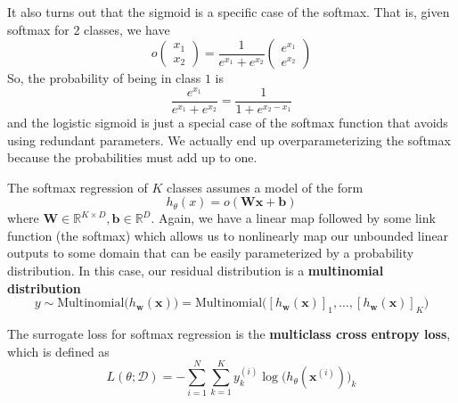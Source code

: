 \documentclass{article}
\begin{document}
  It also turns out that the sigmoid is a specific case of the softmax. That is, given softmax for 2 classes, we have 
  \begin{equation}
    o\begin{pmatrix} x_1 \\ x_2 \end{pmatrix} = \frac{1}{e^{x_1} + e^{x_2}} \begin{pmatrix} e^{x_1} \\ e^{x_2} \end{pmatrix}
  \end{equation}
  So, the probability of being in class $1$ is 
  \begin{equation}
    \frac{e^{x_1}}{e^{x_1} + e^{x_2}} = \frac{1}{1 + e^{x_2 - x_1}}
  \end{equation}
  and the logistic sigmoid is just a special case of the softmax function that avoids using redundant parameters. We actually end up overparameterizing the softmax because the probabilities must add up to one. 

  \begin{definition}
    The softmax regression of $K$ classes assumes a model of the form 
    \begin{equation}
      h_\theta (x) = o ( \mathbf{W} \mathbf{x} + \mathbf{b})
    \end{equation}
    where $\mathbf{W} \in \mathbb{R}^{K \times D}, \mathbf{b} \in \mathbb{R}^D$. Again, we have a linear map followed by some link function (the softmax) which allows us to nonlinearly map our unbounded linear outputs to some domain that can be easily parameterized by a probability distribution. In this case, our residual distribution is a \textbf{multinomial distribution} 
    \begin{equation}
      y \sim \mathrm{Multinomial}\big( h_\mathbf{w} (\mathbf{x}) \big) = \mathrm{Multinomial}\big( [h_\mathbf{w} (\mathbf{x})]_1, \ldots, [h_\mathbf{w} (\mathbf{x})]_K \big)
    \end{equation}
  \end{definition}

  \begin{definition}
    The surrogate loss for softmax regression is the \textbf{multiclass cross entropy loss}, which is defined as 
    \begin{equation}
      L(\theta ; \mathcal{D}) = - \sum_{i=1}^N \sum_{k=1}^K y_k^{(i)} \log \big( h_\theta (\mathbf{x}^{(i)}) \big)_k
    \end{equation}
  \end{definition}
\end{document}
